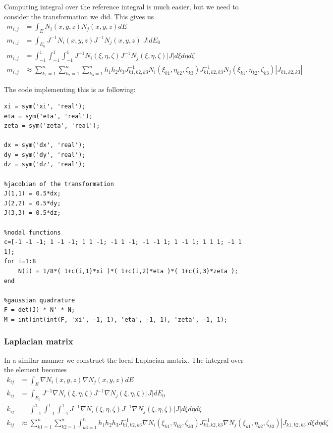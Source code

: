\documentclass[unicode,11pt,a4paper,oneside,numbers=endperiod,openany]{scrartcl}
\begin{document}
Computing integral over the reference integral is much easier, but we need to consider the transformation we did. This gives us 
\begin{align}
    m_{i,j} &= \int_{E} N_i(x,y,z) N_j(x,y,z) dE \\
    m_{i,j} &= \int_{E_0} J^{-1} N_i(x,y,z) J^{-1} N_j(x,y,z) |J| dE_0 \\
    m_{i,j} &= \int_{-1}^1 \int_{-1}^1 \int_{-1}^1 J^{-1} N_i(\xi,\eta,\zeta) J^{-1} N_j(\xi,\eta,\zeta) |J| d\xi d\eta d\zeta \\
    m_{i,j} &\approx \sum_{k_1=1}^n \sum_{k_2=1}^n \sum_{k_3=1}^n h_1 h_2 h_3 J^{-1}_{k1,k2,k3} N_i(\xi_{k1},\eta_{k2},\zeta_{k3}) J^{-1}_{k1,k2,k3} N_j(\xi_{k1},\eta_{k2},\zeta_{k3}) |J_{k1,k2,k3}|
\end{align}

The code implementing this is as following:
\begin{lstlisting}[caption=Local assembly of mass matrix]
xi = sym('xi', 'real');
eta = sym('eta', 'real');
zeta = sym('zeta', 'real');

dx = sym('dx', 'real');
dy = sym('dy', 'real');
dz = sym('dz', 'real');

%jacobian of the transformation
J(1,1) = 0.5*dx;
J(2,2) = 0.5*dy;
J(3,3) = 0.5*dz;

%nodal functions
c=[-1 -1 -1; 1 -1 -1; 1 1 -1; -1 1 -1; -1 -1 1; 1 -1 1; 1 1 1; -1 1 1];
for i=1:8
    N(i) = 1/8*( 1+c(i,1)*xi )*( 1+c(i,2)*eta )*( 1+c(i,3)*zeta );
end

%gaussian quadrature
F = det(J) * N' * N;
M = int(int(int(F, 'xi', -1, 1), 'eta', -1, 1), 'zeta', -1, 1);
\end{lstlisting}

\subsubsection{Laplacian matrix}

In a similar manner we construct the local Laplacian matrix. The integral over the element becomes
\begin{align}
    k_{ij} &= \int_{E} \nabla N_i (x,y,z) \nabla N_j(x,y,z) dE \\
    k_{ij} &= \int_{E_0} J^{-1} \nabla N_i (\xi, \eta, \zeta) J^{-1} \nabla N_j(\xi, \eta, \zeta) |J| dE_0 \\
    k_{ij} &= \int_{-1}^1 \int_{-1}^1 \int_{-1}^1 J^{-1} \nabla N_i (\xi, \eta, \zeta) J^{-1} \nabla N_j(\xi, \eta, \zeta) |J| d\xi d\eta d\zeta \\
    k_{ij} &\approx \sum_{k1=1}^n \sum_{k2=1}^n \int_{k3=1}^n h_1 h_2 h_3 J^{-1}_{k1,k2,k3} \nabla N_i (\xi_{k1}, \eta_{k2}, \zeta_{k3}) J^{-1}_{k1,k2,k3} \nabla N_j(\xi_{k1}, \eta_{k2}, \zeta_{k3}) |J_{k1,k2,k3}| d\xi d\eta d\zeta
\end{align}
\end{document}
